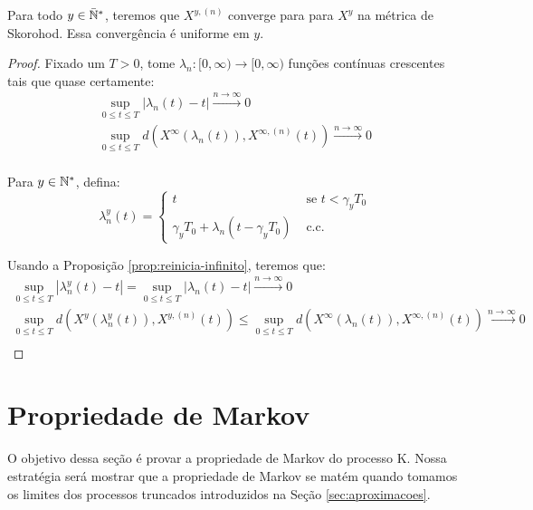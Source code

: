 \begin{corolario}
  \label{cor:convergencia}
  Para todo $y \in {\mathbb{\bar{N}^*}}$, teremos que  $X^{y, (n)}$ converge \qc para
  para $X^y$ na métrica de Skorohod. Essa convergência é uniforme em
  $y$.
\end{corolario}
\begin{proof}
  Fixado um $T > 0$, tome $\lambda_n: [0, \infty) \to [0, \infty)$
  funções contínuas crescentes tais que quase certamente:
  \begin{gather*}
    \sup_{0 \leq t \leq T} |\lambda_n(t) - t|
    \xrightarrow{n\to\infty} 0 \\
    \sup_{0 \leq t \leq T} d(X^\infty(\lambda_n(t)), X^{\infty, (n)}(t))
    \xrightarrow{n\to\infty} 0 \\
  \end{gather*}

  Para $y \in {\mathbb{N^*}}$, defina:
  \begin{displaymath}
    \lambda_n^y(t) = \begin{cases}
      t & \textrm{ se } t < \gamma_y T_0\\
      \gamma_yT_0 + \lambda_n(t - \gamma_y T_0) & \textrm{ c.c.}
    \end{cases}
  \end{displaymath}

  Usando a Proposição \ref{prop:reinicia-infinito}, teremos que:
 \begin{gather*}
   \sup_{0 \leq t \leq T} |\lambda_n^y(t) - t| =
    \sup_{0 \leq t \leq T} |\lambda_n(t) - t|
    \xrightarrow{n\to\infty} 0 \\
    \sup_{0 \leq t \leq T} d(X^y(\lambda_n^y(t)), X^{y, (n)}(t)) \leq
    \sup_{0 \leq t \leq T} d(X^\infty(\lambda_n(t)), X^{\infty, (n)}(t))
    \xrightarrow{n\to\infty} 0 \\
  \end{gather*}
\end{proof}


\section{Propriedade de Markov}
\label{sec:prop-markov}

O objetivo dessa seção é provar a propriedade de Markov do processo
K. Nossa estratégia será mostrar que a propriedade de Markov se matém
quando tomamos os limites dos processos truncados introduzidos na
Seção \ref{sec:aproximacoes}.

